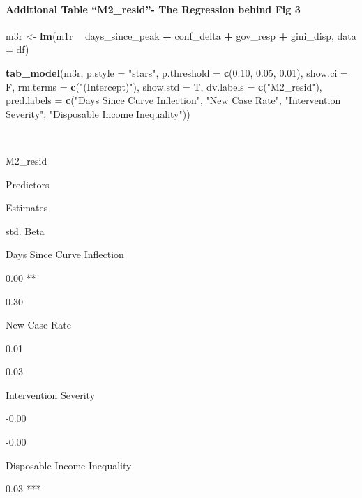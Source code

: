 \documentclass[
]{article}
\newenvironment{Shaded}{\begin{snugshade}}{\end{snugshade}}
\newcommand{\DataTypeTok}[1]{\textcolor[rgb]{0.13,0.29,0.53}{#1}}
\newcommand{\FloatTok}[1]{\textcolor[rgb]{0.00,0.00,0.81}{#1}}
\newcommand{\KeywordTok}[1]{\textcolor[rgb]{0.13,0.29,0.53}{\textbf{#1}}}
\newcommand{\NormalTok}[1]{#1}
\newcommand{\OperatorTok}[1]{\textcolor[rgb]{0.81,0.36,0.00}{\textbf{#1}}}
\newcommand{\StringTok}[1]{\textcolor[rgb]{0.31,0.60,0.02}{#1}}
\begin{document}
\hypertarget{additional-table-m2_resid--the-regression-behind-fig-3}{%
\paragraph{Additional Table ``M2\_resid''- The Regression behind Fig
3}\label{additional-table-m2_resid--the-regression-behind-fig-3}}

\begin{Shaded}
\begin{Highlighting}[]
\NormalTok{m3r <-}\StringTok{ }\KeywordTok{lm}\NormalTok{(m1r }\OperatorTok{~}\StringTok{ }\NormalTok{days_since_peak }\OperatorTok{+}\StringTok{ }\NormalTok{conf_delta }\OperatorTok{+}\StringTok{ }\NormalTok{gov_resp }\OperatorTok{+}\StringTok{ }\NormalTok{gini_disp, }\DataTypeTok{data =}\NormalTok{ df)}

\KeywordTok{tab_model}\NormalTok{(m3r, }\DataTypeTok{p.style =} \StringTok{"stars"}\NormalTok{, }\DataTypeTok{p.threshold =} \KeywordTok{c}\NormalTok{(}\FloatTok{0.10}\NormalTok{, }\FloatTok{0.05}\NormalTok{, }\FloatTok{0.01}\NormalTok{), }\DataTypeTok{show.ci =}\NormalTok{ F, }\DataTypeTok{rm.terms =} \KeywordTok{c}\NormalTok{(}\StringTok{"(Intercept)"}\NormalTok{), }\DataTypeTok{show.std =}\NormalTok{ T, }\DataTypeTok{dv.labels =} \KeywordTok{c}\NormalTok{(}\StringTok{"M2_resid"}\NormalTok{), }\DataTypeTok{pred.labels =} \KeywordTok{c}\NormalTok{(}\StringTok{"Days Since Curve Inflection"}\NormalTok{, }\StringTok{"New Case Rate"}\NormalTok{, }\StringTok{"Intervention Severity"}\NormalTok{, }\StringTok{"Disposable Income Inequality"}\NormalTok{))}
\end{Highlighting}
\end{Shaded}

~

M2\_resid

Predictors

Estimates

std. Beta

Days Since Curve Inflection

0.00 **

0.30

New Case Rate

0.01

0.03

Intervention Severity

-0.00

-0.00

Disposable Income Inequality

0.03 ***
\end{document}

